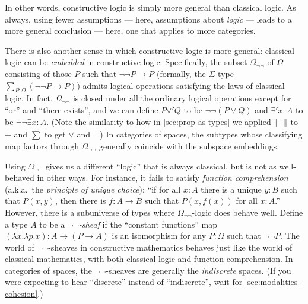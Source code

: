 \documentclass[10pt]{article}
\numberwithin{equation}{section}
\newcommand{\trunc}[2]{\mathopen{}\left\Vert #2\right\Vert_{#1}\mathclose{}}
\newcommand{\brck}[1]{\trunc{}{#1}}
\begin{document}
In other words, constructive logic is simply {more general} than classical logic.
As always, using fewer assumptions --- here, assumptions about \emph{logic} --- leads to a more general conclusion --- here, one that applies to more categories.

There is also another sense in which constructive logic is more general: classical logic can be \emph{embedded} in constructive logic.
Specifically, the subset $\Omega_{\neg\neg}$ of $\Omega$ consisting of those $P$ such that $\neg\neg P \to P$ (formally, the $\Sigma$-type $\sum_{P:\Omega} (\neg\neg P\to P)$) admits logical operations satisfying the laws of classical logic.
In fact, $\Omega_{\neg\neg}$ is closed under all the ordinary logical operations except for ``or'' and ``there exists'', and we can define $P\mathbin{\lor'} Q$ to be $\neg\neg(P\lor Q)$ and $\exists' x:A$ to be $\neg\neg \exists x:A$.
(Note the similarity to how in \cref{sec:prop-as-types} we applied $\brck{-}$ to $+$ and $\sum$ to get $\lor$ and $\exists$.)
In categories of spaces, the subtypes whose classifying map factors through $\Omega_{\neg\neg}$ generally coincide with the subspace embeddings.

Using $\Omega_{\neg\neg}$ gives us a different ``logic'' that is always classical, but is not as well-behaved in other ways.
For instance, it fails to satisfy \emph{function comprehension} (a.k.a.\ the \emph{principle of unique choice}): ``if for all $x:A$ there is a unique $y:B$ such that $P(x,y)$, then there is $f:A\to B$ such that $P(x,f(x))$ for all $x:A$.''
However, there is a subuniverse of types where $\Omega_{\neg\neg}$-logic does behave well.
Define a type $A$ to be a \emph{$\neg\neg$-sheaf} if the ``constant functions'' map $(\lambda x.\lambda p.x):A \to (P\to A)$ is an isomorphism for any $P:\Omega$ such that $\neg\neg P$.
The world of $\neg\neg$-sheaves in constructive mathematics behaves just like the world of classical mathematics, with both classical logic and function comprehension.
In categories of spaces, the $\neg\neg$-sheaves are generally the \emph{indiscrete} spaces.
(If you were expecting to hear ``discrete'' instead of ``indiscrete'', wait for \cref{sec:modalities-cohesion}.)
\end{document}
